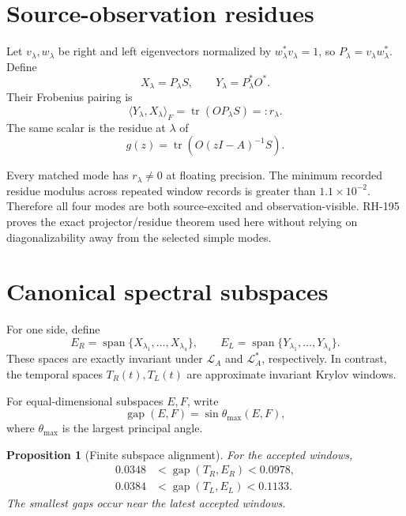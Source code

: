 \documentclass[12pt]{article}
\newtheorem{proposition}[theorem]{Proposition}
\theoremstyle{remark}
\begin{document}
\section{Source-observation residues}

Let $v_\lambda,w_\lambda$ be right and left eigenvectors normalized by
$w_\lambda^*v_\lambda=1$, so
$P_\lambda=v_\lambda w_\lambda^*$.  Define
\begin{equation}\label{eq:source-observation-states}
 X_\lambda=P_\lambda S,
 \qquad
 Y_\lambda=P_\lambda^*O^*.
\end{equation}
Their Frobenius pairing is
\begin{equation}\label{eq:residue}
 \langle Y_\lambda,X_\lambda\rangle_F
 =\operatorname{tr}(OP_\lambda S)
 =:r_\lambda.
\end{equation}
The same scalar is the residue at $\lambda$ of
\begin{equation}\label{eq:transfer}
 g(z)=\operatorname{tr}\!\left(O(zI-A)^{-1}S\right).
\end{equation}

Every matched mode has $r_\lambda\ne0$ at floating precision.  The minimum
recorded residue modulus across repeated window records is greater than
$1.1\times10^{-2}$.  Therefore all four modes are both source-excited and
observation-visible.  RH-195 proves the exact projector/residue theorem used
here without relying on diagonalizability away from the selected simple
modes.

\section{Canonical spectral subspaces}

For one side, define
\begin{equation}\label{eq:canonical-spaces}
 E_R=\operatorname{span}\{X_{\lambda_1},\ldots,X_{\lambda_4}\},
 \qquad
 E_L=\operatorname{span}\{Y_{\lambda_1},\ldots,Y_{\lambda_4}\}.
\end{equation}
These spaces are exactly invariant under $\mathcal L_A$ and
$\mathcal L_A^*$, respectively.  In contrast, the temporal spaces
$T_R(t),T_L(t)$ are approximate invariant Krylov windows.

For equal-dimensional subspaces $E,F$, write
\begin{equation}\label{eq:gap}
 \operatorname{gap}(E,F)=\sin\theta_{\max}(E,F),
\end{equation}
where $\theta_{\max}$ is the largest principal angle.

\begin{proposition}[Finite subspace alignment]\label{prop:alignment}
For the accepted windows,
\begin{align}
 0.0348&<\operatorname{gap}(T_R,E_R)<0.0978,\\
 0.0384&<\operatorname{gap}(T_L,E_L)<0.1133.
\end{align}
The smallest gaps occur near the latest accepted windows.
\end{proposition}
\end{document}
